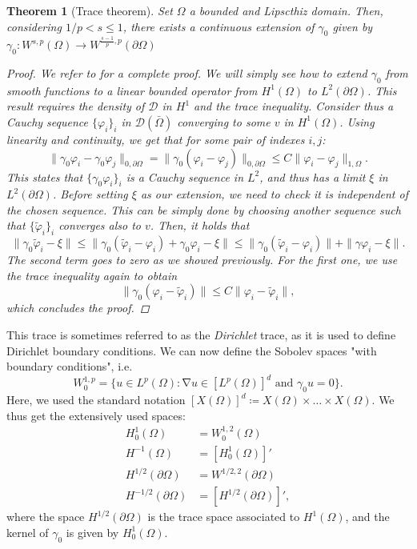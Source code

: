 \documentclass{article}
\DeclareMathOperator{\grad}{\nabla}
\newtheorem{theorem}{Theorem}
\begin{document}
\begin{theorem}[Trace theorem]\label{thm:trace-theorem}
    Set $\Omega$ a bounded and Lipscthiz domain. Then, considering $1/p < s \leq 1$, there exists a continuous extension of $\gamma_0$ given by $\gamma_0: W^{s,p}(\Omega) \to W^{\frac{s-1}{p}, p}(\partial\Omega)$
    \begin{proof}
        We refer to \cite{adams2003sobolev} for a complete proof. We will simply see how to extend $\gamma_0$ from smooth functions to a linear bounded operator from $H^1(\Omega)$ to $L^2(\partial\Omega)$. This result requires the density of $\mathcal D$ in $H^1$ and the trace inequality. Consider thus a Cauchy sequence $\{\varphi_i\}_i$ in $\mathcal D(\bar\Omega)$ converging to some $v$ in $H^1(\Omega)$. Using linearity and continuity, we get that for some pair of indexes $i,j$: 
        $$ \| \gamma_0 \varphi_i - \gamma_0 \varphi_j \|_{0,\partial\Omega} = \| \gamma_0 (\varphi_i - \varphi_j) \|_{0,\partial\Omega} \leq C \| \varphi_i - \varphi_j \|_{1,\Omega}. $$
        This states that $\{ \gamma_0 \varphi_i \}_i $ is a Cauchy sequence in $L^2$, and thus has a limit $\xi$ in $L^2(\partial\Omega)$. Before setting $\xi$ as our extension, we need to check it is independent of the chosen sequence. This can be simply done by choosing another sequence such that $\{\tilde \varphi_i\}_i$ converges also to $v$. Then, it holds that 
        $$ \| \gamma_0 \tilde \varphi_i - \xi \| \leq \| \gamma_0(\tilde\varphi_i - \varphi_i) + \gamma_0 \varphi_i - \xi \| \leq \| \gamma_0(\tilde\varphi_i - \varphi_i) \| + \| \gamma\varphi_i - \xi \|. $$
        The second term goes to zero as we showed previously. For the first one, we use the trace inequality again to obtain 
        $$ \| \gamma_0(\varphi_i - \tilde\varphi_i) \| \leq C \|\varphi_i - \tilde \varphi_i \|, $$
        which concludes the proof. 
    \end{proof}
\end{theorem}

This trace is sometimes referred to as the \emph{Dirichlet} trace, as it is used to define Dirichlet boundary conditions. We can now define the Sobolev spaces "with boundary conditions", i.e. 
    $$ W_0^{1,p} = \{ u \in L^p(\Omega): \grad u \in [L^p(\Omega)]^d \text{ and } \gamma_0 u = 0 \}. $$
Here, we used the standard notation $[X(\Omega)]^d \coloneqq X(\Omega)\times \hdots \times X(\Omega)$. We thus get the extensively used spaces: 
    $$
    \begin{aligned}
        H_0^1(\Omega) &= W_0^{1,2}(\Omega) \\
        H^{-1}(\Omega) &= [H_0^1(\Omega)]' \\
        H^{1/2}(\partial\Omega) &= W^{1/2,2}(\partial\Omega) \\
        H^{-1/2}(\partial\Omega) &= [H^{1/2}(\partial\Omega)]',
    \end{aligned}
    $$
where the space $H^{1/2}(\partial\Omega)$ is the trace space associated to $H^1(\Omega)$, and the kernel of $\gamma_0$ is given by $H_0^1(\Omega)$. 
\end{document}
